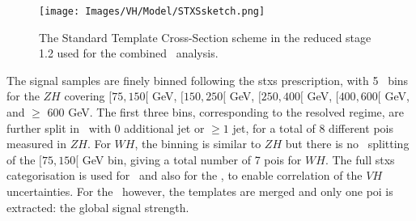   \begin{figure}[!htbp]
    \centering
    \texttt{[image: Images/VH/Model/STXSsketch.png]}
    \caption{The Standard Template Cross-Section scheme in the reduced stage 1.2 used for the combined \vhbc\ analysis.}
    \label{fig:model-stxsscheme}
  \end{figure}

The signal samples are finely binned following the \gls{stxs} prescription, with 5 \ptv\ bins for the $ZH$ covering $[75, 150[$ GeV, $[150, 250[$ GeV, $[250, 400[$ GeV, $[400, 600[$ GeV, and $\geq$ 600 GeV. The first three bins, corresponding to the resolved regime, are further split in \nj\ with 0 additional jet or $\geq 1$ jet, for a total of 8 different \gls{poi}s measured in $ZH$. For $WH$, the binning is similar to $ZH$ but there is no \nj\ splitting of the $[75, 150[$ GeV bin, giving a total number of 7 \gls{poi}s for $WH$. The full \gls{stxs} categorisation is used for \vhb\ and also for the \vhc, to enable correlation of the $VH$ uncertainties. For the \vhc\ however, the templates are merged and only one \gls{poi} is extracted: the global signal strength.\\
  
